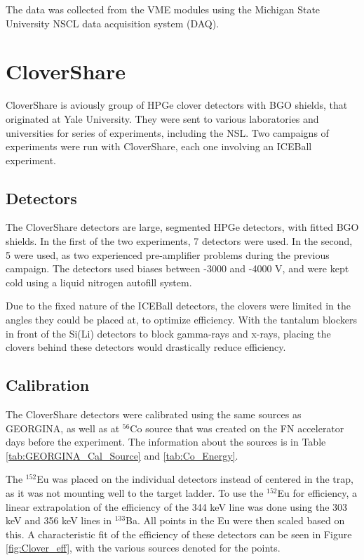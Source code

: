 The data was collected from the VME modules using the Michigan State University NSCL data acquisition system (DAQ).

\section{CloverShare}

CloverShare is aviously group of HPGe clover detectors with BGO shields, that originated at Yale University. They were sent to various laboratories and universities for series of experiments, including the NSL. Two campaigns of experiments were run with CloverShare, each one involving an ICEBall experiment.

\subsection{Detectors}

The CloverShare detectors are large, segmented HPGe detectors, with fitted BGO shields. In the first of the two experiments, 7 detectors were used. In the second, 5 were used, as two experienced pre-amplifier problems during the previous campaign. The detectors used biases between -3000 and -4000 V, and were kept cold using a liquid nitrogen autofill system.

Due to the fixed nature of the ICEBall detectors, the clovers were limited in the angles they could be placed at, to optimize efficiency. With the tantalum blockers in front of the Si(Li) detectors to block gamma-rays and x-rays, placing the clovers behind these detectors would drastically reduce efficiency.

\subsection{Calibration}

The CloverShare detectors were calibrated using the same sources as GEORGINA, as well as at $^{56}$Co source that was created on the FN accelerator days before the experiment. The information about the sources is in Table \ref{tab:GEORGINA_Cal_Source} and \ref{tab:Co_Energy}. 



The $^{152}$Eu was placed on the individual detectors instead of centered in the trap, as it was not mounting well to the target ladder. To use the $^{152}$Eu for efficiency, a linear extrapolation of the efficiency of the 344 keV line was done using the 303 keV and 356 keV lines in $^{133}$Ba. All points in the Eu were then scaled based on this. A characteristic fit of the efficiency of these detectors can be seen in Figure \ref{fig:Clover_eff}, with the various sources denoted for the points.

